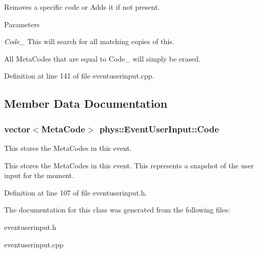 Removes a specific code or Adds it if not present. 


\begin{DoxyParams}{Parameters}
\item[{\em Code\_\-}]This will search for all matching copies of this.\end{DoxyParams}
All MetaCodes that are equal to Code\_\- will simply be erased. 

Definition at line 141 of file eventuserinput.cpp.



\subsection{Member Data Documentation}
\hypertarget{classphys_1_1EventUserInput_aee3dc1d8cac82482651487c48c6c60c9}{
\subsubsection[{Code}]{\setlength{\rightskip}{0pt plus 5cm}vector$<${\bf MetaCode}$>$ {\bf phys::EventUserInput::Code}}}
\label{d7/df5/classphys_1_1EventUserInput_aee3dc1d8cac82482651487c48c6c60c9}


This stores the MetaCodes in this event. 

This stores the MetaCodes in this event. This represents a snapshot of the user input for the moment. 

Definition at line 107 of file eventuserinput.h.



The documentation for this class was generated from the following files:\begin{DoxyCompactItemize}
\item 
eventuserinput.h\item 
eventuserinput.cpp\end{DoxyCompactItemize}
